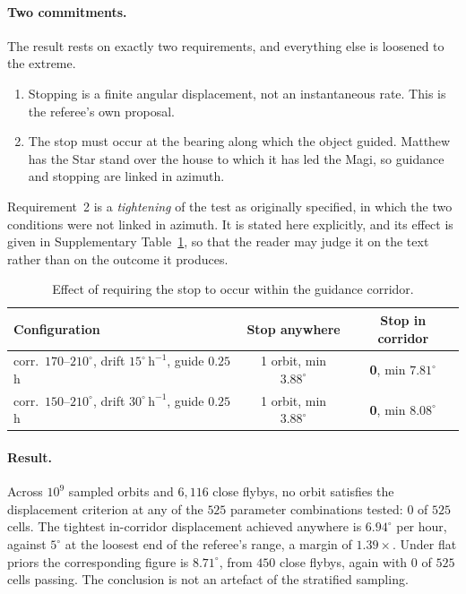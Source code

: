 \documentclass[11pt,a4paper]{article}
\begin{document}
\paragraph{Two commitments.}
The result rests on exactly two requirements, and everything else is loosened
to the extreme.

\begin{enumerate}
  \item Stopping is a finite angular displacement, not an instantaneous rate.
    This is the referee's own proposal.
  \item The stop must occur at the bearing along which the object guided.
    Matthew has the Star stand over the house to which it has led the Magi, so
    guidance and stopping are linked in azimuth.
\end{enumerate}

Requirement~2 is a \emph{tightening} of the test as originally specified, in
which the two conditions were not linked in azimuth. It is stated here
explicitly, and its effect is given in Supplementary Table~\ref{tab:corridorlink}, so that
the reader may judge it on the text rather than on the outcome it produces.

\begin{table}[h]
\centering
\begin{threeparttable}
  \caption{Effect of requiring the stop to occur within the guidance
    corridor.}\label{tab:corridorlink}
\begin{tabular}{@{}lcc@{}}
\toprule
Configuration & Stop anywhere & Stop in corridor \\
\midrule
corr.\ $170$--$210^\circ$, drift $15^\circ\,\mathrm{h}^{-1}$, guide $0.25$\,h
  & 1 orbit, min $3.88^\circ$ & \textbf{0}, min $7.81^\circ$ \\
corr.\ $150$--$210^\circ$, drift $30^\circ\,\mathrm{h}^{-1}$, guide $0.25$\,h
  & 1 orbit, min $3.88^\circ$ & \textbf{0}, min $8.08^\circ$ \\
\bottomrule
\end{tabular}
\end{threeparttable}
\end{table}

\paragraph{Result.}
Across $10^{9}$ sampled orbits and $6{,}116$ close flybys, no orbit satisfies
the displacement criterion at any of the $525$ parameter combinations tested:
$0$ of $525$ cells. The tightest in-corridor displacement achieved anywhere is
$\mathbf{6.94^\circ}$ per hour, against $5^\circ$ at the loosest end of the
referee's range, a margin of $1.39\times$. Under flat priors the corresponding
figure is $8.71^\circ$, from $450$ close flybys, again with $0$ of $525$ cells
passing. The conclusion is not an artefact of the stratified sampling.
\end{document}
